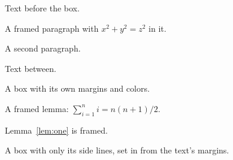 \documentclass{article}
\begin{document}
Text before the box.
\begin{mdframed}
A framed paragraph with $x^2 + y^2 = z^2$ in it.

A second paragraph.
\end{mdframed}
Text between.
\begin{mdframed}[innerleftmargin=20pt, innertopmargin=12pt, linecolor=blue,
  backgroundcolor=yellow!20, linewidth=2pt]
A box with its own margins and colors.
\end{mdframed}
\begin{lemma}\label{lem:one}
A framed lemma: $\sum_{i=1}^n i = n(n+1)/2$.
\end{lemma}
Lemma~\ref{lem:one} is framed.
\begin{mdframed}[topline=false, bottomline=false, leftmargin=20pt, rightmargin=20pt]
A box with only its side lines, set in from the text's margins.
\end{mdframed}
\end{document}
